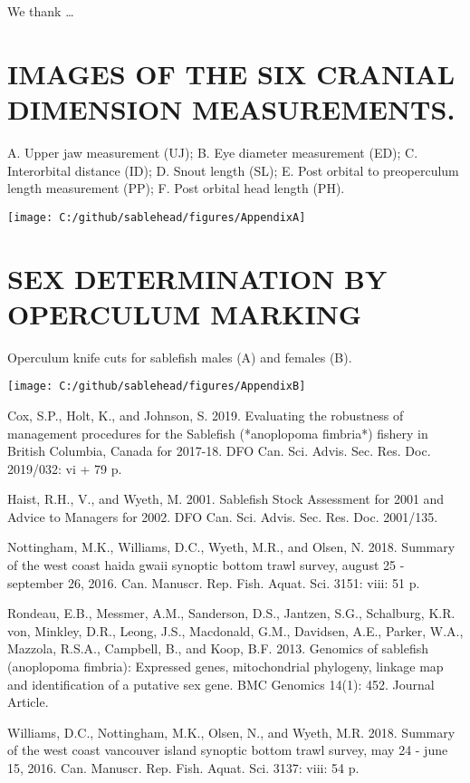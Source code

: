 \documentclass[12pt]{article}\usepackage[]{graphicx}\usepackage[]{color}
\begin{document}
We thank \ldots{}

\begin{appendices}

\clearpage

\section{IMAGES OF THE SIX CRANIAL DIMENSION MEASUREMENTS.}
\label{app:first-appendix}

A. Upper jaw measurement (UJ); B. Eye diameter measurement (ED); C. Interorbital distance (ID); D. Snout length (SL); E. Post orbital to preoperculum length measurement (PP); F. Post orbital head length (PH).
\begin{center}\texttt{[image: C:/github/sablehead/figures/AppendixA]} \end{center}

\clearpage

\section{SEX DETERMINATION BY OPERCULUM MARKING}
\label{app:second-appendix}

Operculum knife cuts for sablefish males (A) and females (B).
\begin{center}\texttt{[image: C:/github/sablehead/figures/AppendixB]} \end{center}
\clearpage

\end{appendices}

\hypertarget{refs}{}
\leavevmode\hypertarget{ref-Cox2019}{}%
Cox, S.P., Holt, K., and Johnson, S. 2019. Evaluating the robustness of management procedures for the Sablefish (*anoplopoma fimbria*) fishery in British Columbia, Canada for 2017-18. DFO Can. Sci. Advis. Sec. Res. Doc. 2019/032: vi + 79 p.

\leavevmode\hypertarget{ref-Haist2001}{}%
Haist, R.H., V., and Wyeth, M. 2001. Sablefish Stock Assessment for 2001 and Advice to Managers for 2002. DFO Can. Sci. Advis. Sec. Res. Doc. 2001/135.

\leavevmode\hypertarget{ref-Nottingham2018}{}%
Nottingham, M.K., Williams, D.C., Wyeth, M.R., and Olsen, N. 2018. Summary of the west coast haida gwaii synoptic bottom trawl survey, august 25 - september 26, 2016. Can. Manuscr. Rep. Fish. Aquat. Sci. 3151: viii: 51 p.

\leavevmode\hypertarget{ref-Rondeau2013}{}%
Rondeau, E.B., Messmer, A.M., Sanderson, D.S., Jantzen, S.G., Schalburg, K.R. von, Minkley, D.R., Leong, J.S., Macdonald, G.M., Davidsen, A.E., Parker, W.A., Mazzola, R.S.A., Campbell, B., and Koop, B.F. 2013. Genomics of sablefish (anoplopoma fimbria): Expressed genes, mitochondrial phylogeny, linkage map and identification of a putative sex gene. BMC Genomics 14(1): 452. Journal Article.

\leavevmode\hypertarget{ref-Williams2018}{}%
Williams, D.C., Nottingham, M.K., Olsen, N., and Wyeth, M.R. 2018. Summary of the west coast vancouver island synoptic bottom trawl survey, may 24 - june 15, 2016. Can. Manuscr. Rep. Fish. Aquat. Sci. 3137: viii: 54 p.
\end{document}
